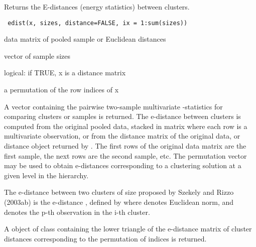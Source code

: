 \documentclass{article}
\begin{document}
\begin{Description}\relax
Returns the E-distances (energy statistics) between clusters.
\end{Description}
\begin{Usage}
\begin{verbatim}
 edist(x, sizes, distance=FALSE, ix = 1:sum(sizes))
\end{verbatim}
\end{Usage}
\begin{Arguments}
\begin{ldescription}
\item[\code{x}] data matrix of pooled sample or Euclidean distances
\item[\code{sizes}] vector of sample sizes
\item[\code{distance}] logical: if TRUE, x is a distance matrix
\item[\code{ix}] a permutation of the row indices of x 
\end{ldescription}
\end{Arguments}
\begin{Details}\relax
A vector containing the pairwise two-sample multivariate 
-statistics for comparing clusters or samples is returned. 
The e-distance between clusters is computed from the original pooled data, 
stacked in matrix  where each row is a multivariate observation, or 
from the distance matrix  of the original data, or distance object 
returned by . The first  rows of the original data 
matrix are the first sample, the next  rows are the second 
sample, etc. The permutation vector  may be used to obtain
e-distances corresponding to a clustering solution at a given level in
the hierarchy.

The e-distance between two clusters 
of size  
proposed by Szekely and Rizzo (2003ab)
is the e-distance , defined by
where
\eqn{\|\cdot\|}{|| ||} denotes Euclidean norm, and  denotes the p-th observation in the i-th cluster.\end{Details}
\begin{Value}
A object of class  containing the lower triangle of the
e-distance matrix of cluster distances corresponding to the permutation 
of indices  is returned.\end{Value}
\end{document}
